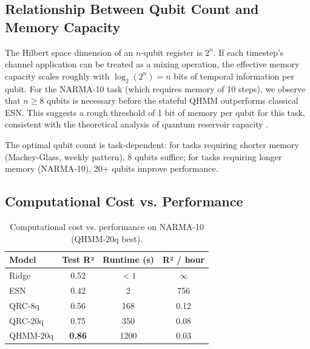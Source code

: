
\subsection{Relationship Between Qubit Count and Memory Capacity}


The Hilbert space dimension of an $n$-qubit register is $2^n$. If each
timestep's channel application can be treated as a mixing operation,
the effective memory capacity scales roughly with $\log_2(2^n) = n$ bits
of temporal information per qubit. For the NARMA-10 task (which requires
memory of 10 steps), we observe that $n \geq 8$ qubits is necessary
before the stateful QHMM outperforms classical ESN. This suggests a
rough threshold of 1 bit of memory per qubit for this task, consistent
with the theoretical analysis of quantum reservoir capacity
\citep{fujii2017keep}.



The optimal qubit count is task-dependent: for tasks requiring shorter
memory (Mackey-Glass, weekly pattern), 8 qubits suffice; for tasks
requiring longer memory (NARMA-10), 20+ qubits improve performance.



\subsection{Computational Cost vs. Performance}



\begin{table}[htbp]
  \centering
  \caption{Computational cost vs. performance on NARMA-10 (QHMM-20q best).}
  \label{tab:cost_benefit}
  \begin{tabular}{@{}lccc@{}}
    \toprule
    Model & Test R² & Runtime (s) & R² / hour \\
    \midrule
    Ridge & 0.52 & $<1$ & $\infty$ \\
    ESN & 0.42 & 2 & 756 \\
    QRC-8q & 0.56 & 168 & 0.12 \\
    QRC-20q & 0.75 & 350 & 0.08 \\
    QHMM-20q & \textbf{0.86} & 1200 & 0.03 \\
    \bottomrule
  \end{tabular}
\end{table}

